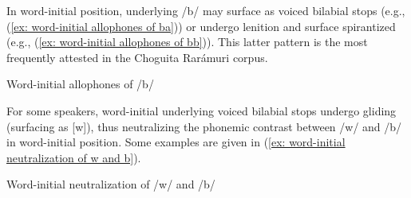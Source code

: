 In word-initial position, underlying /b/ may surface as voiced bilabial stops (e.g., (\ref{ex: word-initial allophones of ba})) or undergo lenition and surface spirantized (e.g., (\ref{ex: word-initial allophones of bb})). This latter pattern is the most frequently attested in the Choguita Rarámuri corpus.

\ea\label{ex: word-initial allophones of b}
{Word-initial allophones of /b/}

    \label{ex: word-initial allophones of ba}
        \label{ex: word-initial allophones of bb}
    \z
\z

For some speakers, word-initial underlying voiced bilabial stops undergo gliding (surfacing as [w]), thus neutralizing the phonemic contrast between /w/ and /b/ in word-initial position. Some examples are given in (\ref{ex: word-initial neutralization of w and b}).

\ea\label{ex: word-initial neutralization of w and b}
{Word-initial neutralization of /w/ and /b/}

